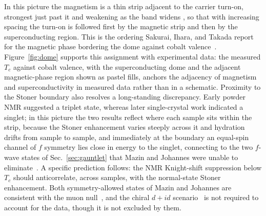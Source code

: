 \documentclass[aps,10pt,preprint,superscriptaddress,floatfix]{revtex4-2}
\begin{document}
In this picture the magnetism is a thin strip adjacent to the carrier turn-on, strongest just past
it and weakening as the band widens , so that with increasing spacing the turn-on is followed first
by the magnetic strip and then by the superconducting region. This is the ordering Sakurai, Ihara,
and Takada report for the magnetic phase bordering the dome against cobalt
valence~\cite{Sakurai2015}. Figure~\ref{fig:dome} supports this assignment with experimental data:
the measured $T_c$ against cobalt valence, with the superconducting dome and the adjacent
magnetic-phase region shown as pastel fills, anchors the adjacency of magnetism and
superconductivity in measured data rather than in a schematic. Proximity to the
Stoner boundary also resolves a long-standing discrepancy. Early powder NMR suggested a triplet
state, whereas later single-crystal work indicated a singlet; in this picture the two results
reflect where each sample sits within the strip, because the Stoner enhancement varies steeply
across it and hydration drifts from sample to sample, and immediately at the boundary an equal-spin
channel of $f$ symmetry lies close in energy to the singlet, connecting to the two $f$-wave states
of Sec.~\ref{sec:gauntlet} that Mazin and Johannes were unable to
eliminate~\cite{MazinJohannes2005}. A specific prediction follows: the NMR Knight-shift suppression
below $T_c$ should anticorrelate, across samples, with the normal-state Stoner enhancement. Both symmetry-allowed states of Mazin and
Johannes are consistent with the muon null~\cite{Higemoto2004}, and the chiral $d+id$
scenario~\cite{Kiesel2013} is not required to account for the data, though it is not excluded by
them.
\end{document}
